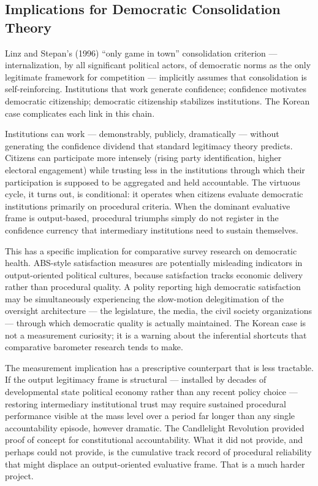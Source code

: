 \documentclass[
  12pt,
  letterpaper]{article}
\begin{document}
\subsection{Implications for Democratic Consolidation
Theory}\label{implications-for-democratic-consolidation-theory}

Linz and Stepan's (1996) ``only game in town'' consolidation criterion
--- internalization, by all significant political actors, of democratic
norms as the only legitimate framework for competition --- implicitly
assumes that consolidation is self-reinforcing. Institutions that work
generate confidence; confidence motivates democratic citizenship;
democratic citizenship stabilizes institutions. The Korean case
complicates each link in this chain.

Institutions can work --- demonstrably, publicly, dramatically ---
without generating the confidence dividend that standard legitimacy
theory predicts. Citizens can participate more intensely (rising party
identification, higher electoral engagement) while trusting less in the
institutions through which their participation is supposed to be
aggregated and held accountable. The virtuous cycle, it turns out, is
conditional: it operates when citizens evaluate democratic institutions
primarily on procedural criteria. When the dominant evaluative frame is
output-based, procedural triumphs simply do not register in the
confidence currency that intermediary institutions need to sustain
themselves.

This has a specific implication for comparative survey research on
democratic health. ABS-style satisfaction measures are potentially
misleading indicators in output-oriented political cultures, because
satisfaction tracks economic delivery rather than procedural quality. A
polity reporting high democratic satisfaction may be simultaneously
experiencing the slow-motion delegitimation of the oversight
architecture --- the legislature, the media, the civil society
organizations --- through which democratic quality is actually
maintained. The Korean case is not a measurement curiosity; it is a
warning about the inferential shortcuts that comparative barometer
research tends to make.

The measurement implication has a prescriptive counterpart that is less
tractable. If the output legitimacy frame is structural --- installed by
decades of developmental state political economy rather than any recent
policy choice --- restoring intermediary institutional trust may require
sustained procedural performance visible at the mass level over a period
far longer than any single accountability episode, however dramatic. The
Candlelight Revolution provided proof of concept for constitutional
accountability. What it did not provide, and perhaps could not provide,
is the cumulative track record of procedural reliability that might
displace an output-oriented evaluative frame. That is a much harder
project.
\end{document}
